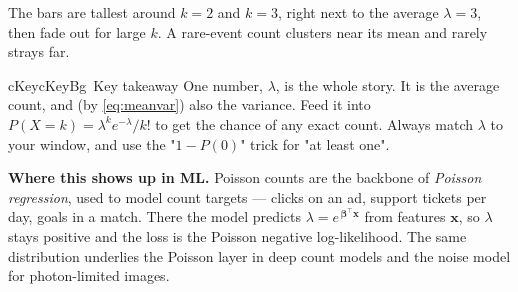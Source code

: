 \documentclass[a4paper,11pt]{article}
\newenvironment{keytakebox}{%
  \begin{calloutbox}{cKey}{cKeyBg}{\ding{52}\, Key takeaway}}{\end{calloutbox}}
\begin{document}
\begin{center}
\end{center}

\noindent The bars are tallest around $k = 2$ and $k = 3$, right next to the
average $\lambda = 3$, then fade out for large $k$. A rare-event count clusters
near its mean and rarely strays far.

\begin{keytakebox}
One number, $\lambda$, is the whole story. It is the average count, and (by
\eqref{eq:meanvar}) also the variance. Feed it into
$P(X{=}k)=\lambda^{k}e^{-\lambda}/k!$ to get the chance of any exact count.
Always match $\lambda$ to your window, and use the "$1 - P(0)$" trick for "at
least one".
\end{keytakebox}

\noindent\textbf{Where this shows up in ML.}
Poisson counts are the backbone of \emph{Poisson regression}, used to model
count targets — clicks on an ad, support tickets per day, goals in a match.
There the model predicts $\lambda = e^{\,\boldsymbol{\beta}^{\!\top}\mathbf{x}}$
from features $\mathbf{x}$, so $\lambda$ stays positive and the loss is the
Poisson negative log-likelihood. The same distribution underlies the Poisson
layer in deep count models and the noise model for photon-limited images.
\end{document}
